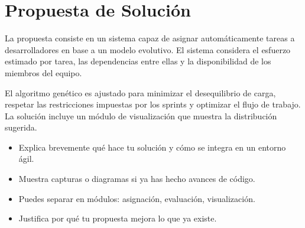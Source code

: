 \section{Propuesta de Solución}

La propuesta consiste en un sistema capaz de asignar automáticamente tareas a desarrolladores en base a un modelo evolutivo. El sistema considera el esfuerzo estimado por tarea, las dependencias entre ellas y la disponibilidad de los miembros del equipo.

El algoritmo genético es ajustado para minimizar el desequilibrio de carga, respetar las restricciones impuestas por los sprints y optimizar el flujo de trabajo. La solución incluye un módulo de visualización que muestra la distribución sugerida.

\vspace{0.5cm}

\begin{tcolorbox}[colback=gray!10, colframe=black!30, title={Sugerencias para esta sección}]
    \begin{itemize}
        \item Explica brevemente qué hace tu solución y cómo se integra en un entorno ágil.
        \item Muestra capturas o diagramas si ya has hecho avances de código.
        \item Puedes separar en módulos: asignación, evaluación, visualización.
        \item Justifica por qué tu propuesta mejora lo que ya existe.
    \end{itemize}
\end{tcolorbox}